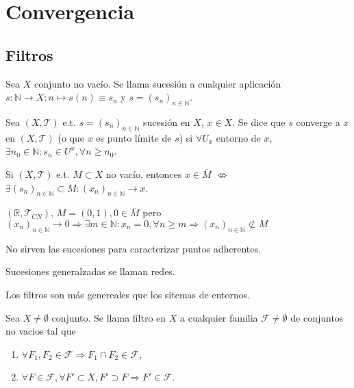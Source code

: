 \chapter{Convergencia}

\section{Filtros}

\begin{defn}[Sucesión]
  Sea $X$ conjunto no vacío. Se llama sucesión a cualquier aplicación $s : \mathbb{N} \to X : n \mapsto s(n) \equiv s_{n}$ y $s = (s_{n})_{n \in \mathbb{N}}$.
\end{defn}

\begin{defn}
  Sea $( X, \mathcal{T} )$ e.t. $s = ( s_{n} )_{n \in \mathbb{N}}$ sucesión en $X$, $x \in X$. Se dice que $s$ converge a $x$ en $( X, \mathcal{T} )$ (o que $x$ es punto límite de $s$) si $\forall U_{x}$ entorno de $x$, $\exists n_{0} \in \mathbb{N} : s_{n} \in U^{x}, \forall n \geq n_{0}$. 
\end{defn}

\begin{obs}
  Si $( X, \mathcal{T} )$ e.t. $M \subset X$ no vacío, entonces $x \in \overline{M}$ $\not \Leftrightarrow$ $\exists ( s_{n} )_{n \in \mathbb{N}} \subset M : ( x_{n} )_{n \in \mathbb{N}} \rightarrow x$.
\end{obs}

\begin{ejm}
  $( \mathbb{R}, \mathcal{T}_{CN} )$, $M = ( 0, 1), 0 \in \overline{M}$ pero $( x_{n} )_{n \in \mathbb{N}} \rightarrow 0 \Rightarrow \exists m \in \mathbb{N} : x_{n} = 0, \forall n \geq m \Rightarrow ( x_{n} )_{n \in \mathbb{N}} \not \subset M$
\end{ejm}

\begin{obs}
  No sirven las sucesiones para caracterizar puntos adherentes.
\end{obs}

\begin{obs}
  Sucesiones generalzadas se llaman redes.
\end{obs}

\begin{obs}
  Los filtros son más genereales que los sitemas de entornos.
\end{obs}

\begin{defn}[Filtro]
  Sea $X \neq \emptyset$ conjunto. Se llama filtro en $X$ a cualquier familia $\mathcal{F} \neq \emptyset$ de conjuntos no vacios tal que
  \begin{enumerate}[label=(\roman*)]
    \item $\forall F_{1}, F_{2} \in \mathcal{F} \Rightarrow F_{1} \cap F_{2} \in \mathcal{F}$,
    \item $\forall F \in \mathcal{F}, \forall F' \subset X, F' \supset F \Rightarrow F' \in \mathcal{F}$.
  \end{enumerate}
\end{defn}

